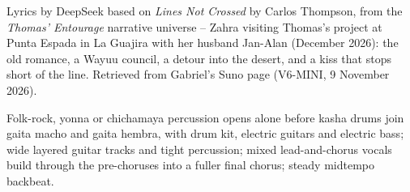 
\label{sec:lines-not-crossed}
\begin{notes}
Lyrics by DeepSeek based on \emph{Lines Not Crossed} by Carlos Thompson, from the \emph{Thomas' Entourage} narrative universe -- Zahra visiting Thomas's project at Punta Espada in La Guajira with her husband Jan-Alan (December 2026): the old romance, a Wayuu council, a detour into the desert, and a kiss that stops short of the line. Retrieved from Gabriel's Suno page (V6-MINI, 9 November 2026).
\end{notes}
\begin{style}
Folk-rock, yonna or chichamaya percussion opens alone before kasha drums join gaita macho and gaita hembra, with drum kit, electric guitars and electric bass; wide layered guitar tracks and tight percussion; mixed lead-and-chorus vocals build through the pre-choruses into a fuller final chorus; steady midtempo backbeat.
\end{style}
